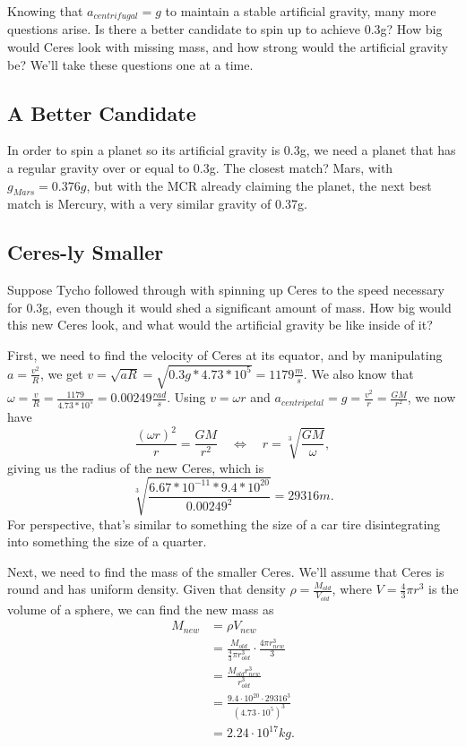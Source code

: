 \documentclass{amsart}
\theoremstyle{definition}
\begin{document}
Knowing that $a_{centrifugal} = g$ to maintain a stable artificial gravity, many more questions arise. Is there a better candidate to spin up to achieve 0.3g? How big would Ceres look with missing mass, and how strong would the artificial gravity be? We'll take these questions one at a time.

\subsection{A Better Candidate}
In order to spin a planet so its artificial gravity is 0.3g, we need a planet that has a regular gravity over or equal to 0.3g. The closest match? Mars, with \(g_{Mars} = 0.376g\), but with the MCR already claiming the planet, the next best match is Mercury, with a very similar gravity of 0.37g.

\subsection{Ceres-ly Smaller}
Suppose Tycho followed through with spinning up Ceres to the speed necessary for 0.3g, even though it would shed a significant amount of mass. How big would this new Ceres look, and what would the artificial gravity be like inside of it?

First, we need to find the velocity of Ceres at its equator, and by manipulating \(a = \frac{v^2}{R}\), we get \(v = \sqrt{aR}= \sqrt{0.3g * 4.73 * 10^5} = 1179\frac{m}{s}\). We also know that \(\omega = \frac{v}{R} = \frac{1179}{4.73*10^5} = 0.00249\frac{rad}{s}\). Using \(v=\omega  r\) and \(a_{centripetal} = g = \frac{v^2}{r} = \frac{GM}{r^2}\), we now have 
\[
\frac{(\omega r)^2}{r} = \frac{G M}{r^2}\quad
\Leftrightarrow \quad r = \sqrt[3]{\frac{GM}{\omega}},
\]
giving us the radius of the new Ceres, which is 
\[
\sqrt[3]{
\frac{6.67*10^{-11}*9.4*10^{20}}{0.00249^2}
} = 29316m.
\]
For perspective, that's similar to something the size of a car tire disintegrating into something the size of a quarter.

Next, we need to find the mass of the smaller Ceres. We'll assume that Ceres is round and has uniform density. Given that density \(\rho = \frac{M_{old}}{V_{old}}\), where \(V=\frac{4}{3}\pi r^3\) is the volume of a sphere, we can find the new mass as 
\begin{align*}
    M_{new} &= \rho V_{new}\\
    &= \frac{M_{old}}{\frac{4}{3}\pi r_{old}^3}\cdot \frac{4\pi r_{new}^3}{3} \\
    &= \frac{M_{old}r_{new}^3}{r_{old}^3} \\
    &= \frac{9.4\cdot10^{20} \cdot 29316^3}{(4.73\cdot 10^5)^3} \\
    &= 2.24\cdot10^{17}kg.
\end{align*}
\end{document}
